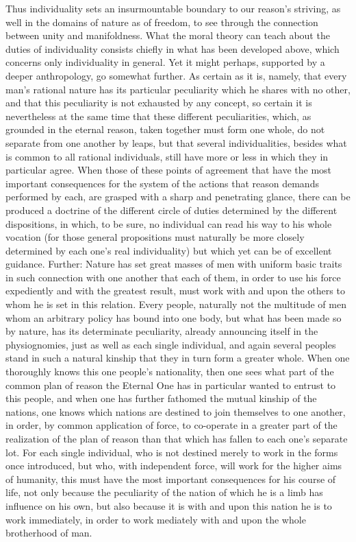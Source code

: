 \documentclass[12pt,a4paper,openany]{book}
\newcommand{\opage}[1]{\marginnote{\footnotesize\textit{[#1]}}}
\begin{document}
Thus individuality sets an insurmountable boundary to our reason's striving, as well
in the domains of nature as of freedom, to see through the connection between unity
and manifoldness. What the moral theory can teach about the duties of individuality
consists chiefly in what has been developed above, which concerns only individuality
in general. Yet it might perhaps, supported by a deeper anthropology, go somewhat
further. As certain as it is, namely, that every man's rational nature has its
particular peculiarity which he shares with no other, and that this peculiarity is
not exhausted by any concept, so certain it is nevertheless at the same time that
these different peculiarities, which, as grounded in the eternal reason, taken
together must form one whole, do not separate from one another by leaps, but that
several individualities, besides what is common to all rational individuals, still
have more or less in which they in particular agree. When those of these points of
agreement that have the most important consequences for the system of the actions
that reason demands performed by each, are grasped with a sharp and penetrating
glance, there can be produced a doctrine of the different circle of duties
determined by the different dispositions, in which, to be sure, no
\setcounter{footnote}{0}%
\opage{90}individual can read his way to his whole vocation (for those general
propositions must naturally be more closely determined by each one's real
individuality) but which yet can be of excellent guidance. Further: Nature has set
great masses of men with uniform basic traits in such connection with one another
that each of them, in order to use his force expediently and with the greatest
result, must work with and upon the others to whom he is set in this relation. Every
people, naturally not the multitude of men whom an arbitrary policy has bound into
one body, but what has been made so by nature, has its determinate peculiarity,
already announcing itself in the physiognomies, just as well as each single
individual, and again several peoples stand in such a natural kinship that they in
turn form a greater whole. When one thoroughly knows this one people's nationality,
then one sees what part of the common plan of reason the Eternal One has in
particular wanted to entrust to this people, and when one has further fathomed the
mutual kinship of the nations, one knows which nations are destined to join
themselves to one another, in order, by common application of force, to co-operate
in a greater part of the realization of the plan of reason than that which has
fallen to each one's separate lot. For each single individual, who is not destined
merely to work in the forms once introduced, but who, with independent force, will
work for the higher aims of humanity, this must have the most important consequences
for his course of life, not only because the peculiarity of the nation of which he is
a limb has influence on his own, but also because it is with and upon this nation he
is to work immediately, in order to work mediately with and upon the whole
brotherhood of man.
\end{document}

